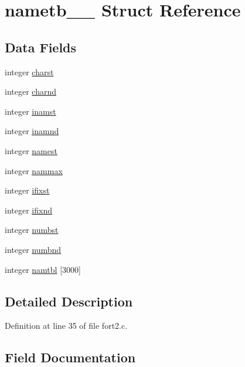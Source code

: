 \hypertarget{structnametb__1__}{}\section{nametb\+\_\+\_\+ Struct Reference}
\label{structnametb__1__}
\subsection*{Data Fields}
\begin{DoxyCompactItemize}
\item 
integer \hyperlink{structnametb__1___a67e1604c3e8d0c95ea9c1fc6cbf51a96}{charst}
\item 
integer \hyperlink{structnametb__1___a229d94d5a0e4d3e189c72c0ec1c38062}{charnd}
\item 
integer \hyperlink{structnametb__1___aa42b70d56c1d149ed2403c0e6144c574}{inamst}
\item 
integer \hyperlink{structnametb__1___ae0c921d7abd0a8f0695bbb016e595be3}{inamnd}
\item 
integer \hyperlink{structnametb__1___a77ec2951347275bc059f7da07eafc9fc}{namest}
\item 
integer \hyperlink{structnametb__1___aa2ff50da92ef183656ad7b78295b93dc}{nammax}
\item 
integer \hyperlink{structnametb__1___aa8dbf908c0dc5e92e16209f1c24411b5}{ifixst}
\item 
integer \hyperlink{structnametb__1___aa7632ff056b72e3a9df73ab79187ba42}{ifixnd}
\item 
integer \hyperlink{structnametb__1___a3a45d2310c7fe0ec0d63a491b42bd7fe}{numbst}
\item 
integer \hyperlink{structnametb__1___acdc63682356af49e0a08c62708659362}{numbnd}
\item 
integer \hyperlink{structnametb__1___afbd53b7fcd93c67699199f76298c40d0}{namtbl} \mbox{[}3000\mbox{]}
\end{DoxyCompactItemize}


\subsection{Detailed Description}


Definition at line 35 of file fort2.\+c.



\subsection{Field Documentation}
